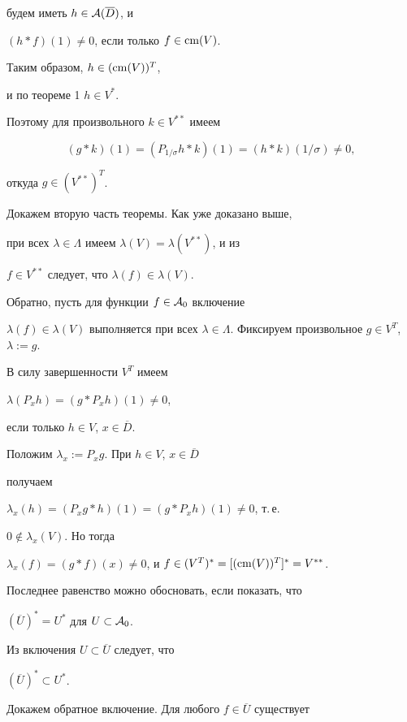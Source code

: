 будем иметь $h\in {\cal A} (\overline{D})$, и 


$(h* f)(1) \neq 0$, если только $f \in \operatorname{cm} (V)$.


Таким образом, $h \in (\operatorname{cm} (V))^T$, 


и по теореме 1\; $h\in V^*$. 


Поэтому для произвольного $k \in V^{**}$ имеем


$$


(g*k)(1) = (P_{1/\sigma} h*k)(1) = (h*k)(1/\sigma) \neq 0,


$$


откуда $g \in (V^{**})^T$.





Докажем вторую часть теоремы. Как уже доказано выше, 


при всех $\lambda \in \Lambda$ имеем $\lambda(V)= \lambda(V^{**})$, и из 


$f\in V^{**}$ следует, что $\lambda(f)\in \lambda(V)$.


Обратно, пусть для функции $f\in {\cal A}_0$ включение 


$\lambda(f) \in \lambda(V)$ выполняется при всех $\lambda \in 


\Lambda$. Фиксируем произвольное $g \in V^T$, $\lambda := g$. 


В силу завершенности $V^T$ имеем 


$\lambda(P_x h)= (g*P_x h)(1) \neq 0$, 


если только $h \in V$, $x \in \overline{D}$.


Положим $\lambda_x :=P_x g$. При $h \in V$, $x \in \overline{D}$ 


получаем 


$\lambda_x (h)=(P_x g*h)(1)= (g*P_x h)(1) \neq 0$, т.\,е. 


$0 \notin \lambda_x (V)$. Но тогда 


$\lambda_x (f) = (g*f)(x) \neq 0$, и $f \in (V^T)^* = 


[(\cm (V))^T]^* = V^{**}$. 


Последнее равенство можно обосновать, если показать, что


$(\overline{U})^* =U^*$ для $U \subset {\cal A}_0$. 


Из включения $U \subset \overline{U}$ следует, что 


$(\overline{U})^* \subset U^*$. 


Докажем обратное включение. Для любого $f\in \overline{U}$ существует 



